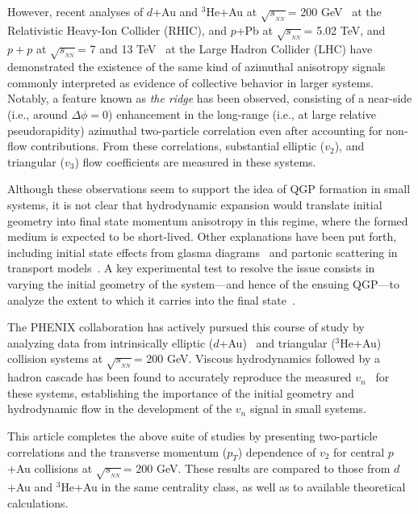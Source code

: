 \documentclass[%
reprint,
showpacs,preprintnumbers,
 amsmath,amssymb,
 aps,
]{revtex4-1}
\newcommand{\pt}{\mbox{$p_T$}\xspace}
\newcommand{\sqsn}{\mbox{$\sqrt{s_{_{NN}}}$}\xspace}
\newcommand{\dau}{\mbox{$d$+Au}\xspace}
\newcommand{\pau}{\mbox{$p$+Au}\xspace}
\newcommand{\hau}{\mbox{$^3\text{He}$+Au}\xspace}
\newcommand{\ppb}{\mbox{$p$+Pb}\xspace}
\begin{document}
However, recent analyses of \dau and \hau at \sqsn = 200 GeV~\cite{adare_measurement_2014,Adamczyk:2014fcx,PhysRevLett.115.142301} at the Relativistic Heavy-Ion Collider (RHIC), and \ppb at \sqsn = 5.02 TeV, and $p+p$ at \sqsn = 7 and 13 TeV~\cite{alice_long_2013,atlas_observation_2012,cms_observation_2012,Khachatryan:2015lva,Aad:2015gqa} at the Large Hadron Collider (LHC) have demonstrated the existence of the same kind of azimuthal anisotropy signals commonly interpreted as evidence of collective behavior in larger systems. Notably, a feature known as \textit{the ridge} has been observed, consisting of a near-side (i.e., around $\Delta \phi = 0$) enhancement in the long-range (i.e., at large relative pseudorapidity) azimuthal two-particle correlation even after accounting for non-flow contributions. From these correlations, substantial elliptic ($v_2$), and triangular ($v_3$) flow coefficients are measured in these systems.

Although these observations seem to support the idea of QGP formation in small systems, it is not clear that hydrodynamic expansion would translate initial geometry into final state momentum anisotropy in this regime, where the formed medium is expected to be short-lived. Other explanations have been put forth, including initial state effects from glasma diagrams~\cite{dusling_azimuthal_2012} and partonic scattering in transport models~\cite{bzdak_elliptic_2014,ma_long-range_2014,Koop:2015wea}. A key experimental test to resolve the issue consists in varying the initial geometry of the system---and hence of the ensuing QGP---to analyze the extent to which it carries into the final state~\cite{nagle_exploiting_2013}. 

The PHENIX collaboration has actively pursued this course of study by analyzing data from intrinsically elliptic (\dau)~\cite{adare_measurement_2014,PhysRevLett.111.212301} and triangular (\hau)~\cite{Adare:2015ctn} collision systems at \sqsn = 200 GeV. Viscous hydrodynamics followed by a hadron cascade has been found to accurately reproduce the measured $v_n$~\cite{Romatschke:2015gxa} for these systems, establishing the importance of the initial geometry and hydrodynamic flow in the development of the $v_n$ signal in small systems.

This article completes the above suite of studies by presenting two-particle correlations and the transverse momentum (\pt) dependence of $v_2$ for central \pau collisions at \sqsn = 200 GeV. These results are compared to those from \dau and \hau in the same centrality class, as well as to available theoretical calculations.
\end{document}
